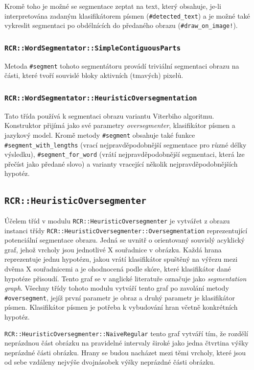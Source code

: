 \documentclass[a4paper]{article}
\begin{document}
Kromě toho je možné se segmentace zeptat na text, který obsahuje, je-li
interpretována zadaným klasifikátorem písmen (\texttt{\#detected\_text}) a
je možné také vykreslit segmentaci po obdélnících do předaného obrazu
(\texttt{\#draw\_on\_image!}).

\subsubsection{\texttt{RCR::WordSegmentator::SimpleContiguousParts}}
Metoda \texttt{\#segment} tohoto segmentátoru provádí triviální segmentaci
obrazu na části, které tvoří souvislé bloky aktivních (tmavých) pixelů.

\subsubsection{\texttt{RCR::WordSegmentator::HeuristicOversegmentation}}
Tato třída používá k segmentaci obrazu variantu Viterbiho algoritmu.
Konstruktor přijímá jako své parametry \textit{oversegmenter}, klasifikátor
písmen a jazykový model. Kromě metody \texttt{\#segment} obsahuje také funkce
\texttt{\#segment\_with\_lengths} (vrací nejpravděpodobnější segmentace pro
různé délky výsledku), \texttt{\#segment\_for\_word} (vrátí nejpravděpodobnější
segmentaci, která lze přečíst jako předané slovo) a varianty vracející několik
nejpravděpodobnějších hypotéz.

\subsection{\texttt{RCR::HeuristicOversegmenter}}
Účelem tříd v modulu \texttt{RCR::HeuristicOversegmenter} je vytvářet z obrazu
instanci třídy \texttt{RCR::HeuristicOversegmenter::Oversegmentation}
reprezentující potenciální segmentace obrazu. Jedná se uvnitř o orientovaný
souvislý acyklický graf, jehož vrcholy jsou jednotlivé X souřadnice v obrázku.
Každá hrana reprezentuje jednu hypotézu, jakou vrátí klasifikátor spuštěný na
výřezu mezi dvěma X souřadnicemi a je ohodnocená podle skóre, které klasifikátor
dané hypotéze přisoudí. Tento graf se v anglické literatuře označuje jako
\textit{segmentation graph}\cite{lecunn}.
Všechny třídy tohoto modulu vytváří tento graf po zavolání metody
\texttt{\#oversegment}, jejíž první parametr je obraz a druhý parametr je
klasifikátor písmen. Klasifikátor písmen je potřeba k vybudování hran včetně
konkrétních hypotéz.

\texttt{RCR::HeuristicOversegmenter::NaiveRegular} tento graf vytváří tím, že
rozdělí neprázdnou část obrázku na pravidelné intervaly široké jako jedna
čtvrtina výšky neprázdné části obrázku. Hrany se budou nacházet mezi těmi
vrcholy, které jsou od sebe vzdáleny nejvýše dvojnásobek výšky neprázdné části
obrázku.
\end{document}
